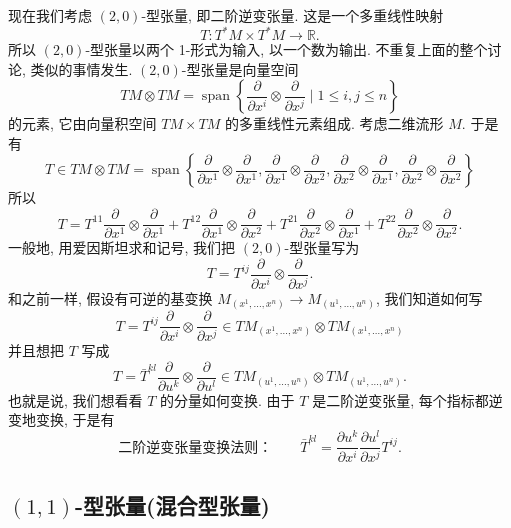现在我们考虑 $(2,0)$-型张量, 即二阶逆变张量. 这是一个多重线性映射
\[
T:T^*M\times T^*M\to\mathbb{R}.
\]
所以 $(2,0)$-型张量以两个 1-形式为输入, 以一个数为输出. 不重复上面的整个讨论, 类似的事情发生. $(2,0)$-型张量是向量空间
\[
TM\otimes TM=\operatorname{span}\left\{\frac{\partial}{\partial x^i}\otimes\frac{\partial}{\partial x^j}\mid 1\leq i,j\leq n\right\}
\]
的元素, 它由向量积空间 $TM\times TM$ 的多重线性元素组成. 考虑二维流形 $M$. 于是有
\[
T\in TM\otimes TM=\operatorname{span}\left\{\frac{\partial}{\partial x^1}\otimes\frac{\partial}{\partial x^1},\frac{\partial}{\partial x^1}\otimes\frac{\partial}{\partial x^2},\frac{\partial}{\partial x^2}\otimes\frac{\partial}{\partial x^1},\frac{\partial}{\partial x^2}\otimes\frac{\partial}{\partial x^2}\right\}
\]
所以
\[
T=T^{11}\frac{\partial}{\partial x^1}\otimes\frac{\partial}{\partial x^1}+T^{12}\frac{\partial}{\partial x^1}\otimes\frac{\partial}{\partial x^2}+T^{21}\frac{\partial}{\partial x^2}\otimes\frac{\partial}{\partial x^1}+T^{22}\frac{\partial}{\partial x^2}\otimes\frac{\partial}{\partial x^2}.
\]
一般地, 用爱因斯坦求和记号, 我们把 $(2,0)$-型张量写为
\[
T=T^{ij}\frac{\partial}{\partial x^i}\otimes\frac{\partial}{\partial x^j}.
\]
和之前一样, 假设有可逆的基变换 $M_{(x^1,\ldots,x^n)}\to M_{(u^1,\ldots,u^n)}$, 我们知道如何写
\[
T=T^{ij}\frac{\partial}{\partial x^i}\otimes\frac{\partial}{\partial x^j}\in TM_{(x^1,\ldots,x^n)}\otimes TM_{(x^1,\ldots,x^n)}
\]
并且想把 $T$ 写成
\[
T=\bar{T}^{kl}\frac{\partial}{\partial u^k}\otimes\frac{\partial}{\partial u^l}\in TM_{(u^1,\ldots,u^n)}\otimes TM_{(u^1,\ldots,u^n)}.
\]
也就是说, 我们想看看 $T$ 的分量如何变换. 由于 $T$ 是二阶逆变张量, 每个指标都逆变地变换, 于是有
\[
\text{二阶逆变张量变换法则：}\qquad \bar{T}^{kl}=\frac{\partial u^k}{\partial x^i}\frac{\partial u^l}{\partial x^j}T^{ij}.
\]

\subsection{$(1,1)$-型张量(混合型张量)}

